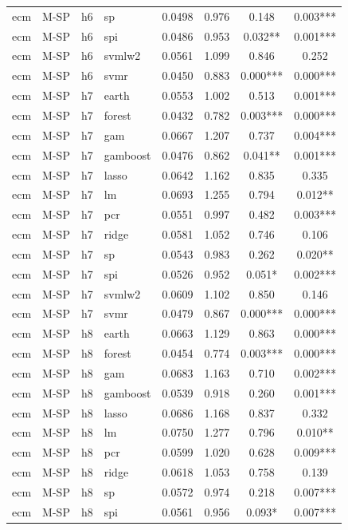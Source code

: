 \begin{ThreePartTable}
\begin{longtable}[t]{llclcccc}
ecm & M-SP & h6 & sp & 0.0498 & 0.976 & 0.148 & 0.003***\\
ecm & M-SP & h6 & spi & 0.0486 & 0.953 & 0.032** & 0.001***\\
ecm & M-SP & h6 & svmlw2 & 0.0561 & 1.099 & 0.846 & 0.252\\
ecm & M-SP & h6 & svmr & 0.0450 & 0.883 & 0.000*** & 0.000***\\
\addlinespace
ecm & M-SP & h7 & earth & 0.0553 & 1.002 & 0.513 & 0.001***\\
ecm & M-SP & h7 & forest & 0.0432 & 0.782 & 0.003*** & 0.000***\\
ecm & M-SP & h7 & gam & 0.0667 & 1.207 & 0.737 & 0.004***\\
ecm & M-SP & h7 & gamboost & 0.0476 & 0.862 & 0.041** & 0.001***\\
ecm & M-SP & h7 & lasso & 0.0642 & 1.162 & 0.835 & 0.335\\
ecm & M-SP & h7 & lm & 0.0693 & 1.255 & 0.794 & 0.012**\\
ecm & M-SP & h7 & pcr & 0.0551 & 0.997 & 0.482 & 0.003***\\
ecm & M-SP & h7 & ridge & 0.0581 & 1.052 & 0.746 & 0.106\\
ecm & M-SP & h7 & sp & 0.0543 & 0.983 & 0.262 & 0.020**\\
ecm & M-SP & h7 & spi & 0.0526 & 0.952 & 0.051* & 0.002***\\
ecm & M-SP & h7 & svmlw2 & 0.0609 & 1.102 & 0.850 & 0.146\\
ecm & M-SP & h7 & svmr & 0.0479 & 0.867 & 0.000*** & 0.000***\\
\addlinespace
ecm & M-SP & h8 & earth & 0.0663 & 1.129 & 0.863 & 0.000***\\
ecm & M-SP & h8 & forest & 0.0454 & 0.774 & 0.003*** & 0.000***\\
ecm & M-SP & h8 & gam & 0.0683 & 1.163 & 0.710 & 0.002***\\
ecm & M-SP & h8 & gamboost & 0.0539 & 0.918 & 0.260 & 0.001***\\
ecm & M-SP & h8 & lasso & 0.0686 & 1.168 & 0.837 & 0.332\\
ecm & M-SP & h8 & lm & 0.0750 & 1.277 & 0.796 & 0.010**\\
ecm & M-SP & h8 & pcr & 0.0599 & 1.020 & 0.628 & 0.009***\\
ecm & M-SP & h8 & ridge & 0.0618 & 1.053 & 0.758 & 0.139\\
ecm & M-SP & h8 & sp & 0.0572 & 0.974 & 0.218 & 0.007***\\
ecm & M-SP & h8 & spi & 0.0561 & 0.956 & 0.093* & 0.007***\\

\end{longtable}
\end{ThreePartTable}
